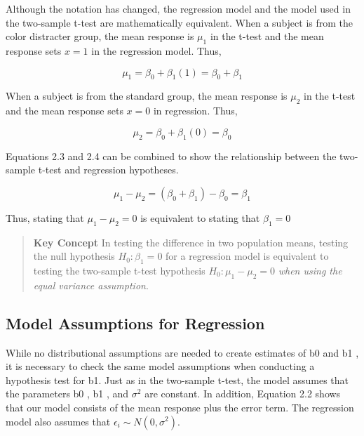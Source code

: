 \documentclass[
]{report}
\begin{document}
Although the notation has changed, the regression model and the model used in the two-sample t-test are mathematically equivalent. When a subject is from the color distracter group, the mean response is \(\mu_1\) in the t-test and the mean response sets \(x = 1\) in the regression model. Thus,

\begin{equation}
\label{2.3} \mu_1 = \beta_0 + \beta_1(1)  = \beta_0 + \beta_1 \tag{2.3}
\end{equation}

When a subject is from the standard group, the mean response is \(\mu_2\) in the t-test and the mean response sets \(x = 0\) in regression. Thus,

\begin{equation}
\label{2.4} \mu_2 = \beta_0 + \beta_1(0)  = \beta_0 \tag{2.4}
\end{equation}

Equations 2.3 and 2.4 can be combined to show the relationship between the two-sample t-test and regression hypotheses.

\begin{equation}
\label{2.5} \mu_1 - \mu_2 = (\beta_0 + \beta_1) -  \beta_0 = \beta_1 \tag{2.5}
\end{equation}

Thus, stating that \(\mu_1 - \mu_2 = 0\) is equivalent to stating that \(\beta_1 = 0\)

\begin{quote}
\textbf{Key Concept}
In testing the difference in two population means, testing the null hypothesis \(H_0 : \beta_1 = 0\) for a regression model is equivalent to testing the two-sample t-test hypothesis \(H_0 : \mu_1 - \mu_2 = 0\) \emph{when using the equal variance assumption}.
\end{quote}

\hypertarget{model-assumptions-for-regression}{%
\subsection{Model Assumptions for Regression}\label{model-assumptions-for-regression}}

While no distributional assumptions are needed to create estimates of b0 and b1 , it is necessary to check the same model assumptions when conducting a hypothesis test for b1. Just as in the two-sample t-test, the model assumes that the parameters b0 , b1 , and \(\sigma^2\) are constant. In addition, Equation 2.2 shows that our model consists of the mean response plus the error term. The regression model also assumes that \(\epsilon_i \sim N(0,\sigma^2)\).
\end{document}
